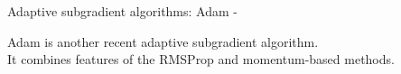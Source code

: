 

\begin{frame}[t,allowframebreaks]{
    Adaptive subgradient algorithms: Adam -}

    \gls{Adam} \cite{Kingma:2017adam} is another recent 
    \gls{adaptive subgradient} algorithm.\\
    \vspace{0.2cm}
    It combines features of the \gls{RMSProp} 
    and \gls{momentum}-based methods.\\


\end{frame}